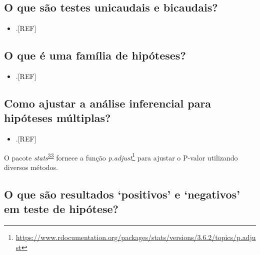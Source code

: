 \documentclass[
  a4paper,
]{book}
\providecommand{\tightlist}{%
  \setlength{\itemsep}{0pt}\setlength{\parskip}{0pt}}
\renewcommand{\href}[2]{#2\footnote{\url{#1}}}
\newenvironment{infobox}[1]
  {
  \begin{itemize}
  \renewcommand{\labelitemi}{
    \raisebox{-.7\height}[0pt][0pt]{
      {\setkeys{Gin}{width=3em,keepaspectratio}
        \texttt{[image: \#1]}}
    }
  }
  \setlength{\fboxsep}{1em}
  \begin{blackbox}
  \item
  }
  {
  \end{blackbox}
  \end{itemize}
  }
\begin{document}
\hypertarget{o-que-suxe3o-testes-unicaudais-e-bicaudais}{%
\subsection{O que são testes unicaudais e bicaudais?}\label{o-que-suxe3o-testes-unicaudais-e-bicaudais}}

\begin{itemize}
\tightlist
\item
  .{[}REF{]}
\end{itemize}

\hypertarget{o-que-uxe9-uma-famuxedlia-de-hipuxf3teses}{%
\subsection{O que é uma família de hipóteses?}\label{o-que-uxe9-uma-famuxedlia-de-hipuxf3teses}}

\begin{itemize}
\tightlist
\item
  .{[}REF{]}
\end{itemize}

\hypertarget{como-ajustar-a-anuxe1lise-inferencial-para-hipuxf3teses-muxfaltiplas}{%
\subsection{Como ajustar a análise inferencial para hipóteses múltiplas?}\label{como-ajustar-a-anuxe1lise-inferencial-para-hipuxf3teses-muxfaltiplas}}

\begin{itemize}
\tightlist
\item
  .{[}REF{]}
\end{itemize}

\begin{infobox}{images/Rlogo}
O pacote \emph{stats}\textsuperscript{\protect\hyperlink{ref-stats-2}{33}} fornece a função \href{https://www.rdocumentation.org/packages/stats/versions/3.6.2/topics/p.adjust}{\emph{p.adjust}} para ajustar o P-valor utilizando diversos métodos.

\end{infobox}

\hypertarget{o-que-suxe3o-resultados-positivos-e-negativos-em-teste-de-hipuxf3tese}{%
\subsection{O que são resultados `positivos' e `negativos' em teste de hipótese?}\label{o-que-suxe3o-resultados-positivos-e-negativos-em-teste-de-hipuxf3tese}}
\end{document}
